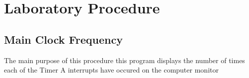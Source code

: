 \section{Laboratory Procedure}

\subsection{Main Clock Frequency}

The main purpose of this procedure 
this program displays the number of times each of the Timer A interrupts have occured on the computer monitor